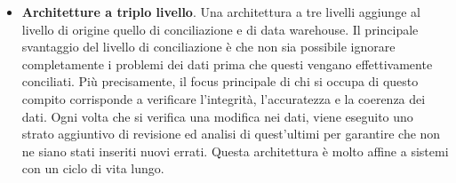 \begin{itemize}
\begin{enumerate}
            \item La \textit{profilazione dei dati}\footnote{La \textit{profilazione dei dati} è il processo di esame dei dati disponibili da una fonte di informazioni esistente e la raccolta di statistiche o riepiloghi formativi su tali dati \cite{wikipedia_data_profiling}.} è l'ultimo livello poiché si occupa di convalidare l'integrità dei dati e gli standard di una possibile presentazione. Esso comprende anche analisi avanzate come la generazione di rapporti in tempo reale e batch e le visualizzazioni.
        \end{enumerate}
    \item \textbf{Architetture a triplo livello}. Una architettura a tre livelli aggiunge al livello di origine quello di conciliazione e di data warehouse. Il principale svantaggio del livello di conciliazione è che non sia possibile ignorare completamente i problemi dei dati prima che questi vengano effettivamente conciliati. Più precisamente, il focus principale di chi si occupa di questo compito corrisponde a verificare l'integrità, l'accuratezza e la coerenza dei dati. Ogni volta che si verifica una modifica nei dati, viene eseguito uno strato aggiuntivo di revisione ed analisi di quest'ultimi per garantire che non ne siano stati inseriti nuovi errati. Questa architettura è molto affine a sistemi con un ciclo di vita lungo.
\end{itemize}

